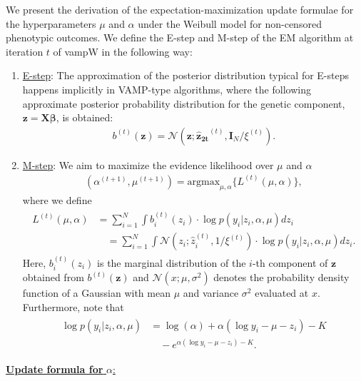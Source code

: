 We %
present the derivation of the expectation-maximization update formulae for the hyperparameters $\mu$ and $\alpha$ under the Weibull model for non-censored phenotypic outcomes. We define the E-step and M-step of the EM algorithm at iteration $t$ of vampW in the following way:
\begin{enumerate}
    \item \underline{E-step}: The approximation of the posterior distribution typical for E-steps happens implicitly in VAMP-type algorithms, where the following
    approximate posterior probability distribution for the genetic component, $\bm{z} = \bm{X} \bm{\beta}$,  is obtained:
    \begin{align}
        b^{(t)}(\bm{z}) = \mathcal{N}(\bm{z}; \bm{\hat{z}_{2t}}^{(t)}, \bm{I}_N / \xi^{(t)}).
    \end{align}
    \item \underline{M-step}: We aim to maximize the evidence likelihood over $\mu$ and $\alpha$
    \begin{align}
        (\alpha^{(t+1)}, \mu^{(t+1)}) = \text{argmax}_{\mu, \alpha} \{ L^{(t)}(\mu, \alpha) \},
    \end{align}
    where we define 
    \begin{align}
        \begin{split}
        L^{(t)}(\mu, \alpha) & = \sum_{i=1}^N \int b_i^{(t)}(z_i) \cdot \log p(y_i|z_i, \alpha, \mu) dz_i \\
        & \quad = \sum_{i=1}^N \int \mathcal{N}(z_i; \hat{z}_i^{(t)}, 1 / \xi^{(t)}) \cdot \log p(y_i|z_i, \alpha, \mu) dz_i.
        \end{split}
    \end{align}
Here, $b_i^{(t)}(z_i)$ is the marginal distribution of the $i$-th component of $\bm{z}$ obtained from $b^{(t)}(\bm{z})$ and $\mathcal{N}(x; \mu, \sigma^2)$ denotes the probability density function of a Gaussian with mean $\mu$ and variance $\sigma^2$ evaluated at $x$.
    Furthermore, note that
    \begin{align}
        \begin{split}
        \log p(y_i|z_i, \alpha, \mu) & = \log(\alpha) + \alpha(\log y_i - \mu - z_i) - K \\
        & \quad - e^{\alpha(\log y_i - \mu - z_i) - K}.
        \end{split}
    \end{align}
\end{enumerate}
\underline{\textbf{Update formula for} $\alpha$:} \newline \newline
